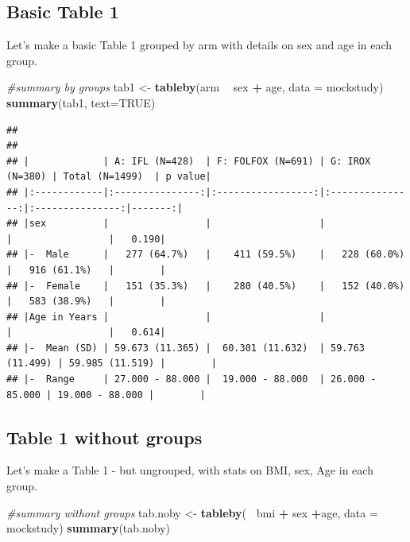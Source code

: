 \documentclass[
]{book}
\newenvironment{Shaded}{\begin{snugshade}}{\end{snugshade}}
\newcommand{\CommentTok}[1]{\textcolor[rgb]{0.56,0.35,0.01}{\textit{#1}}}
\newcommand{\DataTypeTok}[1]{\textcolor[rgb]{0.13,0.29,0.53}{#1}}
\newcommand{\KeywordTok}[1]{\textcolor[rgb]{0.13,0.29,0.53}{\textbf{#1}}}
\newcommand{\NormalTok}[1]{#1}
\newcommand{\OperatorTok}[1]{\textcolor[rgb]{0.81,0.36,0.00}{\textbf{#1}}}
\newcommand{\OtherTok}[1]{\textcolor[rgb]{0.56,0.35,0.01}{#1}}
\newcommand{\StringTok}[1]{\textcolor[rgb]{0.31,0.60,0.02}{#1}}
\begin{document}
\hypertarget{basic-table-1}{%
\subsection{Basic Table 1}\label{basic-table-1}}

Let's make a basic Table 1 grouped by arm
with details on sex and age in each group.

\begin{Shaded}
\begin{Highlighting}[]
\CommentTok{#summary by groups}
\NormalTok{tab1 <-}\StringTok{ }\KeywordTok{tableby}\NormalTok{(arm }\OperatorTok{~}\StringTok{ }\NormalTok{sex }\OperatorTok{+}\StringTok{ }\NormalTok{age, }\DataTypeTok{data =}\NormalTok{ mockstudy)}
\KeywordTok{summary}\NormalTok{(tab1, }\DataTypeTok{text=}\OtherTok{TRUE}\NormalTok{)}
\end{Highlighting}
\end{Shaded}

\begin{verbatim}
## 
## 
## |             | A: IFL (N=428)  | F: FOLFOX (N=691) | G: IROX (N=380) | Total (N=1499)  | p value|
## |:------------|:---------------:|:-----------------:|:---------------:|:---------------:|-------:|
## |sex          |                 |                   |                 |                 |   0.190|
## |-  Male      |   277 (64.7%)   |    411 (59.5%)    |   228 (60.0%)   |   916 (61.1%)   |        |
## |-  Female    |   151 (35.3%)   |    280 (40.5%)    |   152 (40.0%)   |   583 (38.9%)   |        |
## |Age in Years |                 |                   |                 |                 |   0.614|
## |-  Mean (SD) | 59.673 (11.365) |  60.301 (11.632)  | 59.763 (11.499) | 59.985 (11.519) |        |
## |-  Range     | 27.000 - 88.000 |  19.000 - 88.000  | 26.000 - 85.000 | 19.000 - 88.000 |        |
\end{verbatim}

\hypertarget{table-1-without-groups}{%
\subsection{Table 1 without groups}\label{table-1-without-groups}}

Let's make a Table 1 - but ungrouped, with stats on BMI, sex, Age
in each group.

\begin{Shaded}
\begin{Highlighting}[]
\CommentTok{#summary without groups}
\NormalTok{tab.noby <-}\StringTok{ }\KeywordTok{tableby}\NormalTok{(}\OperatorTok{~}\StringTok{ }\NormalTok{bmi }\OperatorTok{+}\StringTok{ }\NormalTok{sex }\OperatorTok{+}\NormalTok{age, }\DataTypeTok{data =}\NormalTok{ mockstudy)}
\KeywordTok{summary}\NormalTok{(tab.noby)}
\end{Highlighting}
\end{Shaded}
\end{document}
